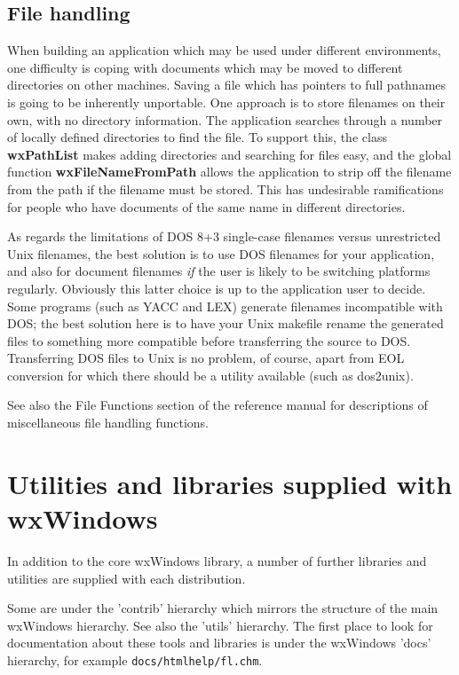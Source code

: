 \section{File handling}

When building an application which may be used under different
environments, one difficulty is coping with documents which may be
moved to different directories on other machines. Saving a file which
has pointers to full pathnames is going to be inherently unportable. One
approach is to store filenames on their own, with no directory
information.  The application searches through a number of locally
defined directories to find the file. To support this, the class {\bf
wxPathList} makes adding directories and searching for files easy, and
the global function {\bf wxFileNameFromPath} allows the application to
strip off the filename from the path if the filename must be stored.
This has undesirable ramifications for people who have documents of the
same name in different directories.

As regards the limitations of DOS 8+3 single-case filenames versus
unrestricted Unix filenames, the best solution is to use DOS filenames
for your application, and also for document filenames {\it if} the user
is likely to be switching platforms regularly. Obviously this latter
choice is up to the application user to decide.  Some programs (such as
YACC and LEX) generate filenames incompatible with DOS; the best
solution here is to have your Unix makefile rename the generated files
to something more compatible before transferring the source to DOS.
Transferring DOS files to Unix is no problem, of course, apart from EOL
conversion for which there should be a utility available (such as
dos2unix).

See also the File Functions section of the reference manual for
descriptions of miscellaneous file handling functions.

\chapter{Utilities and libraries supplied with wxWindows}\label{utilities}
%
\setfooter{\thepage}{}{}{}{}{\thepage}%

In addition to the core wxWindows library, a number of further
libraries and utilities are supplied with each distribution.

Some are under the 'contrib' hierarchy which mirrors the
structure of the main wxWindows hierarchy. See also the 'utils'
hierarchy. The first place to look for documentation about
these tools and libraries is under the wxWindows 'docs' hierarchy,
for example {\tt docs/htmlhelp/fl.chm}.

